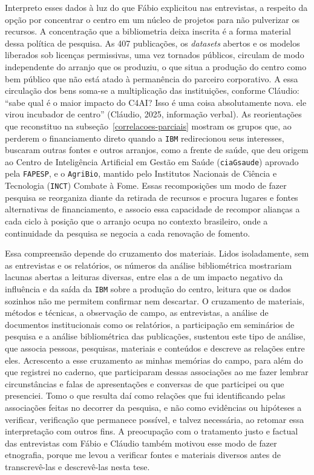 Interpreto esses dados à luz do que Fábio explicitou nas entrevistas, a respeito da opção por concentrar o centro em um núcleo de projetos para não pulverizar os recursos. A concentração que a bibliometria deixa inscrita é a forma material dessa política de pesquisa. As 407 publicações, os \textit{datasets} abertos e os modelos liberados sob licenças permissivas, uma vez tornados públicos, circulam de modo independente do arranjo que os produziu, o que situa a produção do centro como bem público que não está atado à permanência do parceiro corporativo. A essa circulação dos bens soma-se a multiplicação das instituições, conforme Cláudio: \enquote{sabe qual é o maior impacto do C4AI? Isso é uma coisa absolutamente nova. ele virou incubador de centro} (Cláudio, 2025, informação verbal). As reorientações que reconstituo na subseção~\ref{correlacoes-parciais} mostram os grupos que, ao perderem o financiamento direto quando a \texttt{IBM} redirecionou seus interesses, buscaram outras fontes e outros arranjos, como a frente de saúde, que deu origem ao Centro de Inteligência Artificial em Gestão em Saúde (\texttt{ciaGsaude}) aprovado pela \texttt{FAPESP}, e o \texttt{AgriBio}, mantido pelo Institutos Nacionais de Ciência e Tecnologia (\texttt{INCT}) Combate à Fome. Essas recomposições um modo de fazer pesquisa se reorganiza diante da retirada de recursos e procura lugares e fontes alternativas de financiamento, e associo essa capacidade de recompor alianças a cada ciclo à posição que o arranjo ocupa no contexto brasileiro, onde a continuidade da pesquisa se negocia a cada renovação de fomento.

Essa compreensão depende do cruzamento dos materiais. Lidos isoladamente, sem as entrevistas e os relatórios, os números da análise bibliométrica mostrariam lacunas abertas a leituras diversas, entre elas a de um impacto negativo da influência e da saída da \texttt{IBM} sobre a produção do centro, leitura que os dados sozinhos não me permitem confirmar nem descartar. O cruzamento de materiais, métodos e técnicas, a observação de campo, as entrevistas, a análise de documentos institucionais como os relatórios, a participação em seminários de pesquisa e a análise bibliométrica das publicações, sustentou este tipo de análise, que associa pessoas, pesquisas, materiais e conteúdos e descreve as relações entre eles. Acrescento a esse cruzamento as minhas memórias do campo, para além do que registrei no caderno, que participaram dessas associações ao me fazer lembrar circunstâncias e falas de apresentações e conversas de que participei ou que presenciei. Tomo o que resulta daí como relações que fui identificando pelas associações feitas no decorrer da pesquisa, e não como evidências ou hipóteses a verificar, verificação que permanece possível, e talvez necessária, ao retomar essa interpretação com outros fins. A preocupação com o tratamento justo e factual das entrevistas com Fábio e Cláudio também motivou esse modo de fazer etnografia, porque me levou a verificar fontes e materiais diversos antes de transcrevê-las e descrevê-las nesta tese.


